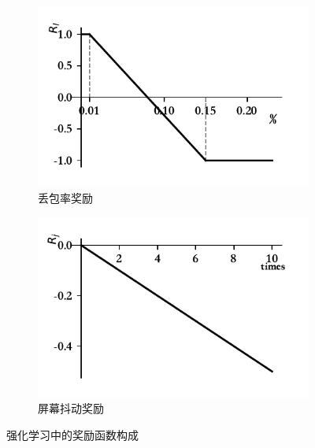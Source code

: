 \begin{figure}[ht]
\begin{subfigure}[t]{0.5\linewidth}
  \centering
  \includegraphics[width=\linewidth]{figures/chap03/reward_function/Rl.pdf}
  \caption{丢包率奖励}
  \label{fig:Loss Ratio Reward}
\end{subfigure}%
\begin{subfigure}[t]{0.5\linewidth}
  \centering
  \includegraphics[width=\linewidth]{figures/chap03/reward_function/Rj.pdf}
  \caption{屏幕抖动奖励}
  \label{fig:jitter Reward}
\end{subfigure}

\caption{强化学习中的奖励函数构成}
\label{fig:reward-function}
\end{figure}

